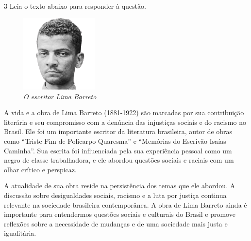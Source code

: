 \num{3} Leia o texto abaixo para responder à questão.

\begin{myquote}

\begin{figure}  %
  \centering
  \includegraphics[width=0.35\textwidth]{./imgSAEB_7_POR/media/image43.png}
  \caption{\textit{O escritor Lima Barreto}}
\end{figure}

A vida e a obra de Lima Barreto (1881-1922) são marcadas por sua contribuição
literária e seu compromisso com a denúncia das injustiças sociais e do racismo
no Brasil. Ele foi um importante escritor da literatura brasileira, autor de
obras como ``Triste Fim de Policarpo Quaresma'' e ``Memórias do Escrivão
Isaías Caminha''. Sua escrita foi influenciada pela sua experiência pessoal
como um negro de classe trabalhadora, e ele abordou questões sociais e raciais
com um olhar crítico e perspicaz.

A atualidade de sua obra reside na persistência dos temas que ele abordou. 
A discussão sobre desigualdades sociais, racismo e a luta por justiça
continua relevante na sociedade brasileira contemporânea. A obra de Lima
Barreto ainda é importante para entendermos questões
sociais e culturais do Brasil e promove reflexões sobre a necessidade de
mudanças e de uma sociedade mais justa e igualitária. 





\end{myquote}

